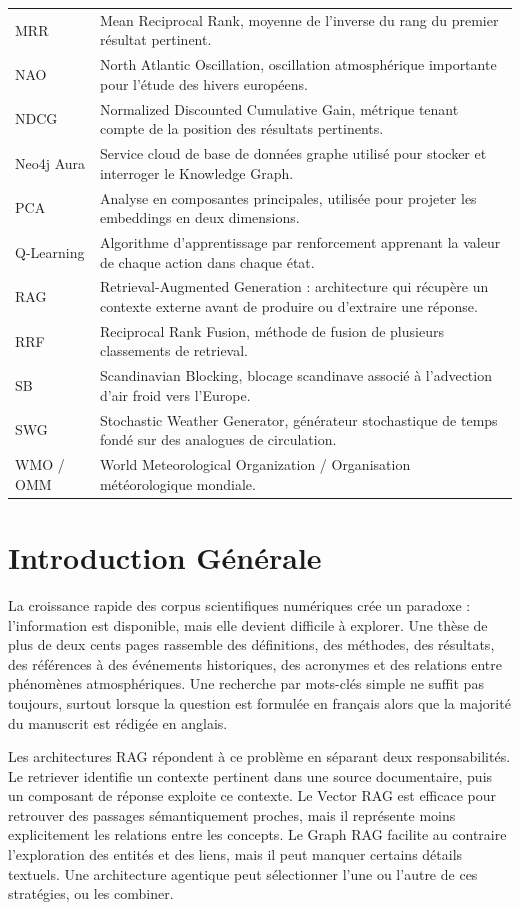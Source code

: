 \documentclass[12pt,a4paper,oneside]{report}
\begin{document}
\begin{longtable}{p{}p{}}
MRR & Mean Reciprocal Rank, moyenne de l'inverse du rang du premier résultat pertinent.\\
NAO & North Atlantic Oscillation, oscillation atmosphérique importante pour l'étude des hivers européens.\\
NDCG & Normalized Discounted Cumulative Gain, métrique tenant compte de la position des résultats pertinents.\\
Neo4j Aura & Service cloud de base de données graphe utilisé pour stocker et interroger le Knowledge Graph.\\
PCA & Analyse en composantes principales, utilisée pour projeter les embeddings en deux dimensions.\\
Q-Learning & Algorithme d'apprentissage par renforcement apprenant la valeur de chaque action dans chaque état.\\
RAG & Retrieval-Augmented Generation : architecture qui récupère un contexte externe avant de produire ou d'extraire une réponse.\\
RRF & Reciprocal Rank Fusion, méthode de fusion de plusieurs classements de retrieval.\\
SB & Scandinavian Blocking, blocage scandinave associé à l'advection d'air froid vers l'Europe.\\
SWG & Stochastic Weather Generator, générateur stochastique de temps fondé sur des analogues de circulation.\\
WMO / OMM & World Meteorological Organization / Organisation météorologique mondiale.\\
\bottomrule
\end{longtable}

\clearpage
\chapter*{Introduction Générale}
La croissance rapide des corpus scientifiques numériques crée un paradoxe : l'information est disponible, mais elle devient difficile à explorer. Une thèse de plus de deux cents pages rassemble des définitions, des méthodes, des résultats, des références à des événements historiques, des acronymes et des relations entre phénomènes atmosphériques. Une recherche par mots-clés simple ne suffit pas toujours, surtout lorsque la question est formulée en français alors que la majorité du manuscrit est rédigée en anglais.

Les architectures RAG répondent à ce problème en séparant deux responsabilités. Le retriever identifie un contexte pertinent dans une source documentaire, puis un composant de réponse exploite ce contexte. Le Vector RAG est efficace pour retrouver des passages sémantiquement proches, mais il représente moins explicitement les relations entre les concepts. Le Graph RAG facilite au contraire l'exploration des entités et des liens, mais il peut manquer certains détails textuels. Une architecture agentique peut sélectionner l'une ou l'autre de ces stratégies, ou les combiner.
\end{document}
